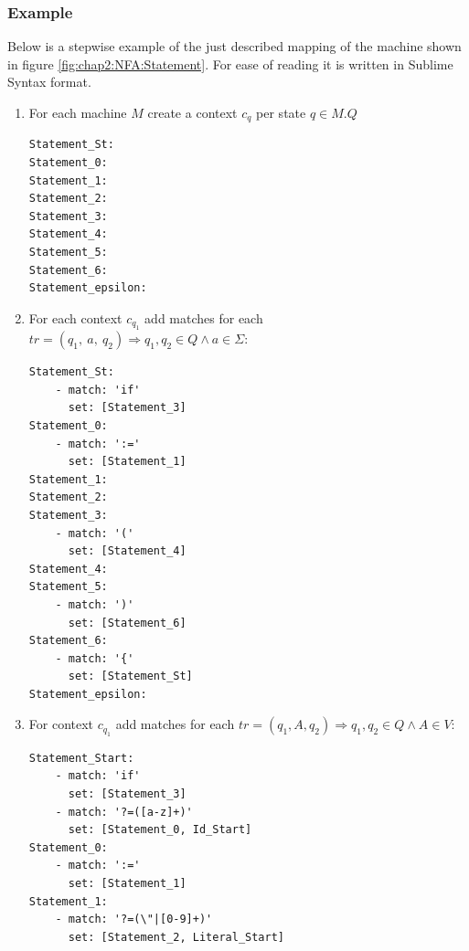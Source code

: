 	\subsubsection{Example}
	Below is a stepwise example of the just described mapping of the machine shown in figure \ref{fig:chap2:NFA:Statement}. For ease of reading it is written in Sublime Syntax format.
\begin{enumerate}
\item For each machine $M$ create a context $c_q$ per state $q \in M.Q$
\begin{lstlisting}[language=SublimeSyntax]
Statement_St:
Statement_0:
Statement_1:
Statement_2:
Statement_3:
Statement_4:
Statement_5:
Statement_6:
Statement_epsilon:
\end{lstlisting}
\item For each context $c_{q_1}$ add matches for each $tr=(q_1,\ a,\ q_2) \Rightarrow q_1, q_2 \in Q \land a \in \Sigma$:
\begin{lstlisting}[language=SublimeSyntax]
Statement_St:
	- match: 'if'
	  set: [Statement_3]
Statement_0:
	- match: ':='
	  set: [Statement_1]
Statement_1:
Statement_2:
Statement_3:
	- match: '('
	  set: [Statement_4]
Statement_4:
Statement_5:
	- match: ')'
	  set: [Statement_6]
Statement_6:
	- match: '{'
	  set: [Statement_St]
Statement_epsilon:
\end{lstlisting}	
\item For context $c_{q_1}$ add matches for each $tr=(q_1, A, q_2) \Rightarrow q_1, q_2 \in Q \land A \in V$:
\begin{lstlisting}[language=SublimeSyntax]
Statement_Start:
	- match: 'if'
	  set: [Statement_3]
 	- match: '?=([a-z]+)'
	  set: [Statement_0, Id_Start]
Statement_0:
	- match: ':='
	  set: [Statement_1]
Statement_1:
 	- match: '?=(\"|[0-9]+)'
	  set: [Statement_2, Literal_Start]
	  

\end{lstlisting}
\end{enumerate}
